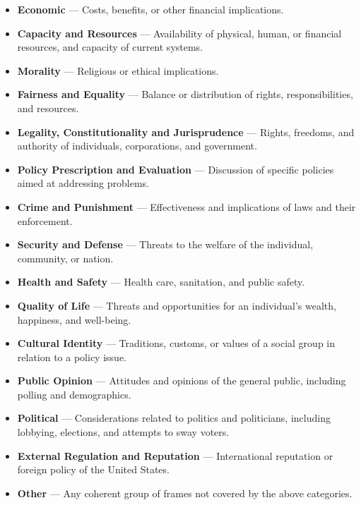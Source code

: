 \documentclass[
10pt, %
a4paper, %
oneside, %
headinclude,footinclude, %
] {book}%
\begin{document}
\begin{itemize}
    \item \textbf{Economic} — Costs, benefits, or other financial implications.

    \item \textbf{Capacity and Resources} — Availability of physical, human, or financial resources, and capacity of current systems.

    \item \textbf{Morality} — Religious or ethical implications.

    \item \textbf{Fairness and Equality} — Balance or distribution of rights, responsibilities, and resources.

    \item \textbf{Legality, Constitutionality and Jurisprudence} — Rights, freedoms, and authority of individuals, corporations, and government.

    \item \textbf{Policy Prescription and Evaluation} — Discussion of specific policies aimed at addressing problems.

    \item \textbf{Crime and Punishment} — Effectiveness and implications of laws and their enforcement.

    \item \textbf{Security and Defense} — Threats to the welfare of the individual, community, or nation.

    \item \textbf{Health and Safety} — Health care, sanitation, and public safety.

    \item \textbf{Quality of Life} — Threats and opportunities for an individual's wealth, happiness, and well-being.

    \item \textbf{Cultural Identity} — Traditions, customs, or values of a social group in relation to a policy issue.

    \item \textbf{Public Opinion} — Attitudes and opinions of the general public, including polling and demographics.

    \item \textbf{Political} — Considerations related to politics and politicians, including lobbying, elections, and attempts to sway voters.

    \item \textbf{External Regulation and Reputation} — International reputation or foreign policy of the United States.

    \item \textbf{Other} — Any coherent group of frames not covered by the above categories.
\end{itemize}
\end{document}

